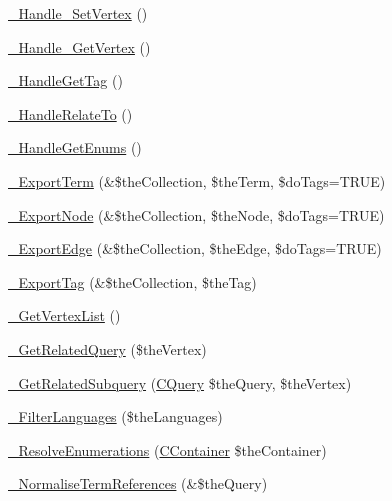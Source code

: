 \begin{DoxyCompactItemize}
\hyperlink{class_c_ontology_wrapper_a0634a48b2fa3ffc6b9b229c7e63d1611}{\-\_\-\-Handle\-\_\-\-Set\-Vertex} ()
\item 
\hyperlink{class_c_ontology_wrapper_a9a2e6b3a9911dcfe1b1e5bffc20f451e}{\-\_\-\-Handle\-\_\-\-Get\-Vertex} ()
\item 
\hyperlink{class_c_ontology_wrapper_aa25444a57bb5746f743a2195667ea4de}{\-\_\-\-Handle\-Get\-Tag} ()
\item 
\hyperlink{class_c_ontology_wrapper_a38e3d92a704e327580c541e0bf0c51b0}{\-\_\-\-Handle\-Relate\-To} ()
\item 
\hyperlink{class_c_ontology_wrapper_a97cffdfee4bb6d7841201dd2bc7fd0f2}{\-\_\-\-Handle\-Get\-Enums} ()
\item 
\hyperlink{class_c_ontology_wrapper_a4e4ca830c618987caaa7dd0542e73dcf}{\-\_\-\-Export\-Term} (\&\$the\-Collection, \$the\-Term, \$do\-Tags=T\-R\-U\-E)
\item 
\hyperlink{class_c_ontology_wrapper_aeeb219d5ec2e33ec4fb1deb8f8c2284e}{\-\_\-\-Export\-Node} (\&\$the\-Collection, \$the\-Node, \$do\-Tags=T\-R\-U\-E)
\item 
\hyperlink{class_c_ontology_wrapper_a116afbf3c771558c63857a3be172d3a5}{\-\_\-\-Export\-Edge} (\&\$the\-Collection, \$the\-Edge, \$do\-Tags=T\-R\-U\-E)
\item 
\hyperlink{class_c_ontology_wrapper_a7f295f7da04d526b963fac0d2ddbc362}{\-\_\-\-Export\-Tag} (\&\$the\-Collection, \$the\-Tag)
\item 
\hyperlink{class_c_ontology_wrapper_aabedfd89f1829927c2f115073e2805f4}{\-\_\-\-Get\-Vertex\-List} ()
\item 
\hyperlink{class_c_ontology_wrapper_a6743af8581329c1fb5ccd2dc860b0701}{\-\_\-\-Get\-Related\-Query} (\$the\-Vertex)
\item 
\hyperlink{class_c_ontology_wrapper_a851254326f30e2be713ff8138e4ded07}{\-\_\-\-Get\-Related\-Subquery} (\hyperlink{class_c_query}{C\-Query} \$the\-Query, \$the\-Vertex)
\item 
\hyperlink{class_c_ontology_wrapper_ae479b8f21490acc903bdc9a27875de9e}{\-\_\-\-Filter\-Languages} (\$the\-Languages)
\item 
\hyperlink{class_c_ontology_wrapper_a44b44339e82da36fdffe6d76f71aa2e8}{\-\_\-\-Resolve\-Enumerations} (\hyperlink{class_c_container}{C\-Container} \$the\-Container)
\item 
\hyperlink{class_c_ontology_wrapper_a825424d5394114f69acb8edcc45b05a5}{\-\_\-\-Normalise\-Term\-References} (\&\$the\-Query)
\end{DoxyCompactItemize}

